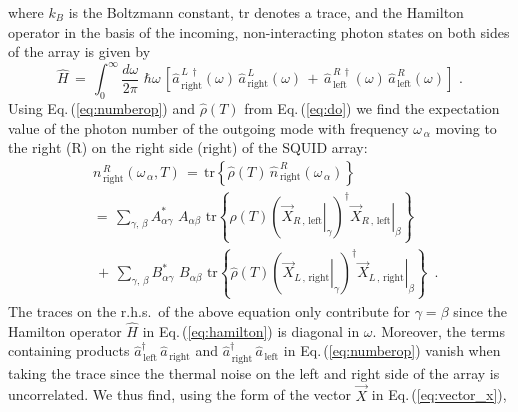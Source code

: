 %
where $k_B$ is the Boltzmann constant, tr denotes a trace, and the Hamilton operator 
in the basis of the incoming, non-interacting photon states 
on both sides of the array is given by
%
\begin{equation} \label{eq:hamilton}
\hat{H} \, = \, \int_{0}^{\infty} \frac{d{\omega}}{2 \pi} \, \, \hbar \omega \, 
\left[
\hat{a}_{\,\text{right}}^{\,L\,\dagger}(\omega) \, 
\hat{a}_{\,\text{right}}^{\,L}(\omega) \, + \,
\hat{a}_{\,\text{left}}^{\,R\,\dagger}(\omega) \, 
\hat{a}_{\,\text{left}}^{\,R}(\omega) 
\right] \, \, .
\end{equation}
%
Using Eq.\,(\ref{eq:numberop}) and $\hat{\rho}(T)$ from Eq.\,(\ref{eq:do}) we find 
the expectation value of the photon number of the outgoing mode with frequency 
$\omega_{\,\alpha}$ moving to the right (R) on the right side (right) of the SQUID array:
%
\begin{equation} \label{eq:numberthermal} 
\begin{split}
& n_{\,\text{right}}^{\,R}(\omega_{\,\alpha}, T) \, = \, 
\text{tr} \left\{ \hat{\rho}(T) \, \hat{n}_{\,\text{right}}^{\,R}(\omega_{\,\alpha}) \right\} \\[3mm]
& = \, \sum\limits_{\gamma, \, \beta} A_{\alpha \gamma}^* \, \, A_{\alpha \beta}  \, \,
\text{tr}  \left\{ \hat{\rho}(T) 
\left( \left. \vec{X}_{R\,,\,\text{left}} \right|_{\gamma} \right)^{\dagger}
\left. \vec{X}_{R\,,\,\text{left}} \right|_{\beta} \right\} \\[3mm]
& \, + \, \sum\limits_{\gamma, \, \beta} B_{\alpha \gamma}^* \, \, B_{\alpha \beta}  \, \, 
\text{tr}  \left\{ \hat{\rho}(T) 
\left( \left. \vec{X}_{L\,,\,\text{right}} \right|_{\gamma} \right)^{\dagger}
\left. \vec{X}_{L\,,\,\text{right}} \right|_{\beta} \right\}
\, \, \, .
\end{split}
\end{equation}
% 
The traces on the r.h.s.~of the above equation 
only contribute for $\gamma = \beta$ since the Hamilton operator $\hat{H}$ in Eq.\,(\ref{eq:hamilton}) 
is diagonal in $\omega$. 
Moreover, the terms containing products $\hat{a}_{\,\text{left}}^{\dagger} \, \hat{a}_{\,\text{right}}$ and 
$\hat{a}_{\,\text{right}}^{\dagger} \, \hat{a}_{\,\text{left}}$ in Eq.\,(\ref{eq:numberop})
vanish when taking the trace since the thermal noise on the left and right side of the array
is uncorrelated. We thus find, using the form of the vector 
$\vec{X}$ in Eq.\,(\ref{eq:vector_x}),

